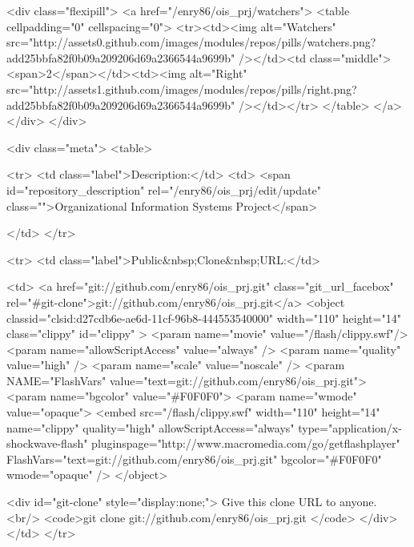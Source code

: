         <div class="flexipill">
          <a href="/enry86/ois_prj/watchers">
          <table cellpadding="0" cellspacing="0">
            <tr><td><img alt="Watchers" src="http://assets0.github.com/images/modules/repos/pills/watchers.png?add25bbfa82f0b09a209206d69a2366544a9699b" /></td><td class="middle"><span>2</span></td><td><img alt="Right" src="http://assets1.github.com/images/modules/repos/pills/right.png?add25bbfa82f0b09a209206d69a2366544a9699b" /></td></tr>
          </table>
          </a>
        </div>
      </div>
    
    <div class="meta">
      <table>
        
        
          <tr>
            <td class="label">Description:</td>
            <td>
              <span id="repository_description" rel="/enry86/ois_prj/edit/update" class="">Organizational Information Systems Project</span>
              
            </td>
          </tr>
        

        
          

          
            <tr>
              <td class="label">Public&nbsp;Clone&nbsp;URL:</td>
              
              <td>
                <a href="git://github.com/enry86/ois_prj.git" class="git_url_facebox" rel="#git-clone">git://github.com/enry86/ois_prj.git</a>
                      <object classid="clsid:d27cdb6e-ae6d-11cf-96b8-444553540000"
              width="110"
              height="14"
              class="clippy"
              id="clippy" >
      <param name="movie" value="/flash/clippy.swf"/>
      <param name="allowScriptAccess" value="always" />
      <param name="quality" value="high" />
      <param name="scale" value="noscale" />
      <param NAME="FlashVars" value="text=git://github.com/enry86/ois_prj.git">
      <param name="bgcolor" value="#F0F0F0">
      <param name="wmode" value="opaque">
      <embed src="/flash/clippy.swf"
             width="110"
             height="14"
             name="clippy"
             quality="high"
             allowScriptAccess="always"
             type="application/x-shockwave-flash"
             pluginspage="http://www.macromedia.com/go/getflashplayer"
             FlashVars="text=git://github.com/enry86/ois_prj.git"
             bgcolor="#F0F0F0"
             wmode="opaque"
      />
      </object>

                <div id="git-clone" style="display:none;">
                  Give this clone URL to anyone.
                  <br/>
                  <code>git clone git://github.com/enry86/ois_prj.git </code>
                </div>
              </td>
            </tr>
          
